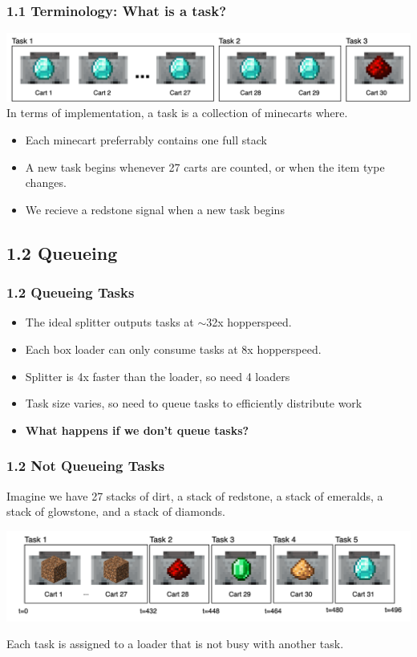 \documentclass[aspectratio=169]{beamer}
\begin{document}
\begin{frame}
	\frametitle{1.1 Terminology: What is a task?}
    \includegraphics[width=1\textwidth]{tasks.png}
    \break
    In terms of implementation, a task is a collection of minecarts where.
    \begin{itemize}
        \item Each minecart preferrably contains one full stack
        \item A new task begins whenever 27 carts are counted, or when the item type changes.
        \item We recieve a redstone signal when a new task begins
    \end{itemize}

\end{frame}
\subsection{1.2 Queueing}

\begin{frame}
	\frametitle{1.2 Queueing Tasks}
    \begin{itemize}
        \item The ideal splitter outputs tasks at $\sim$32x hopperspeed.
        \item Each box loader can only consume tasks at 8x hopperspeed.
        \item Splitter is 4x faster than the loader, so need 4 loaders
        \item Task size varies, so need to queue tasks to efficiently distribute work
        \item \textbf{What happens if we don't queue tasks?}

    \end{itemize}

    
\end{frame}


\begin{frame}
	\frametitle{1.2 Not Queueing Tasks}

    Imagine we have 27 stacks of dirt, a stack of redstone, a stack of emeralds, a stack of glowstone, and a stack of diamonds.

    \includegraphics[width=1\textwidth]{example1.png}

    Each task is assigned to a loader that is not busy with another task.
\end{frame}
\end{document}
